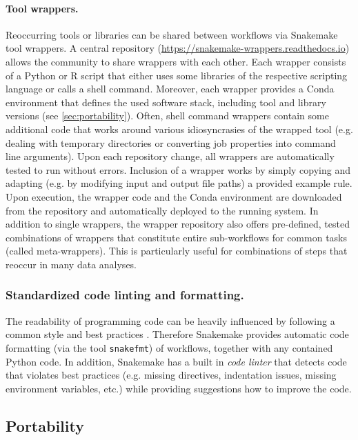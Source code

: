 \documentclass[parskip=half]{scrartcl}
\let\plainurl\url
\renewcommand{\url}[1]{\protect\plainurl{#1}}
\begin{document}
\paragraph{Tool wrappers.}
Reoccurring tools or libraries can be shared between workflows via Snakemake tool wrappers.
A central repository (\url{https://snakemake-wrappers.readthedocs.io}) allows the community to share wrappers with each other.
Each wrapper consists of a Python or R script that either uses some libraries of the respective scripting language or calls a shell command.
Moreover, each wrapper provides a Conda environment that defines the used software stack, including tool and library versions (see \autoref{sec:portability}).
Often, shell command wrappers contain some additional code that works around various idiosyncrasies of the wrapped tool (e.g. dealing with temporary directories or converting job properties into command line arguments).
Upon each repository change, all wrappers are automatically tested to run without errors.
Inclusion of a wrapper works by simply copying and adapting (e.g. by modifying input and output file paths) a provided example rule.
Upon execution, the wrapper code and the Conda environment are downloaded from the repository and automatically deployed to the running system.
In addition to single wrappers, the wrapper repository also offers pre-defined, tested combinations of wrappers that constitute entire sub-workflows for common tasks (called meta-wrappers).
This is particularly useful for combinations of steps that reoccur in many data analyses.

\subsubsection{Standardized code linting and formatting.}\label{sec:style}

The readability of programming code can be heavily influenced by following a common style and best practices \parencite{tysell_sundkvist_code_2017}.
Therefore Snakemake provides automatic code formatting (via the tool \lstinline!snakefmt!) of workflows, together with any contained Python code.
In addition, Snakemake has a built in \emph{code linter} that detects code that violates best practices (e.g. missing directives, indentation issues, missing environment variables, etc.) while providing suggestions how to improve the code.

\subsection{Portability}\label{sec:portability}
\end{document}
